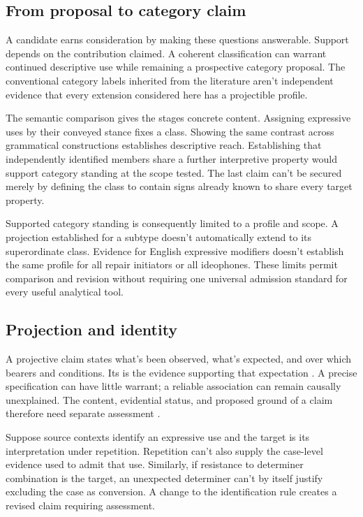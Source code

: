 \subsection{From proposal to category claim}

A candidate earns consideration by making these questions answerable.
Support depends on the contribution claimed. A coherent classification
can warrant continued descriptive use while remaining a prospective
category proposal. The conventional category labels inherited from the
literature aren't independent evidence that every extension considered
here has a projectible profile.

The semantic comparison gives the stages concrete content. Assigning
expressive uses by their conveyed stance fixes a class. Showing the
same contrast across grammatical constructions establishes descriptive
reach. Establishing that independently identified members share a
further interpretive property would support category standing at the
scope tested. The last claim can't be secured merely by defining the
class to contain signs already known to share every target property.

Supported category standing is consequently limited to a profile and
scope. A projection established for a subtype doesn't automatically
extend to its superordinate class. Evidence for English expressive
modifiers doesn't establish the same profile for all repair initiators
or all ideophones. These limits permit comparison and revision without
requiring one universal admission standard for every useful analytical
tool.

\subsection{Projection and identity}

A projective claim states what's been observed, what's expected, and
over which bearers and conditions. Its  is the evidence
supporting that expectation \citep{Goodman1955}. A precise specification
can have little warrant; a reliable association can remain causally
unexplained. The content, evidential status, and proposed ground of a
claim therefore need separate assessment
\citep[11--12]{reynolds2026projectibilityHistory}.

Suppose source contexts identify an expressive use and the target is
its interpretation under repetition. Repetition can't also supply the
case-level evidence used to admit that use. Similarly, if resistance
to determiner combination is the target, an unexpected determiner
can't by itself justify excluding the case as conversion. A change
to the identification rule creates a revised claim requiring assessment.

